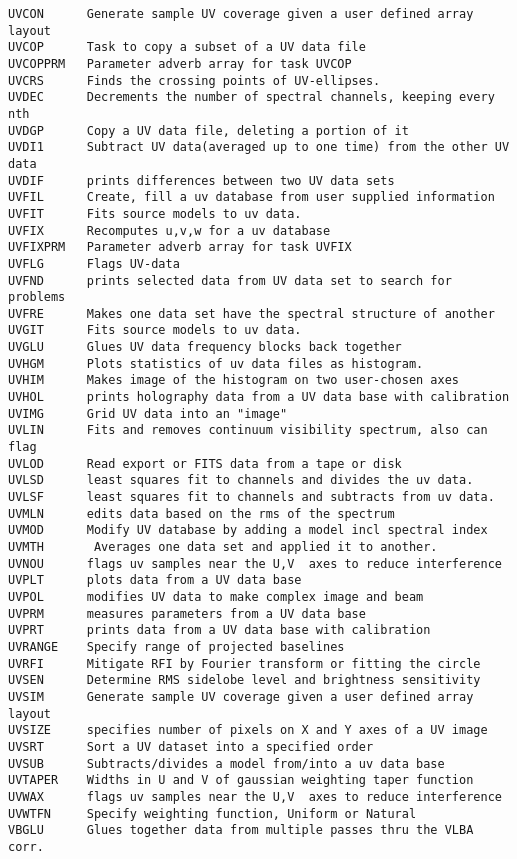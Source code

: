 \begin{verbatim}
UVCON      Generate sample UV coverage given a user defined array layout
UVCOP      Task to copy a subset of a UV data file
UVCOPPRM   Parameter adverb array for task UVCOP
UVCRS      Finds the crossing points of UV-ellipses.
UVDEC      Decrements the number of spectral channels, keeping every nth
UVDGP      Copy a UV data file, deleting a portion of it
UVDI1      Subtract UV data(averaged up to one time) from the other UV data
UVDIF      prints differences between two UV data sets
UVFIL      Create, fill a uv database from user supplied information
UVFIT      Fits source models to uv data.
UVFIX      Recomputes u,v,w for a uv database
UVFIXPRM   Parameter adverb array for task UVFIX
UVFLG      Flags UV-data
UVFND      prints selected data from UV data set to search for problems
UVFRE      Makes one data set have the spectral structure of another
UVGIT      Fits source models to uv data.
UVGLU      Glues UV data frequency blocks back together
UVHGM      Plots statistics of uv data files as histogram.
UVHIM      Makes image of the histogram on two user-chosen axes
UVHOL      prints holography data from a UV data base with calibration
UVIMG      Grid UV data into an "image"
UVLIN      Fits and removes continuum visibility spectrum, also can flag
UVLOD      Read export or FITS data from a tape or disk
UVLSD      least squares fit to channels and divides the uv data.
UVLSF      least squares fit to channels and subtracts from uv data.
UVMLN      edits data based on the rms of the spectrum
UVMOD      Modify UV database by adding a model incl spectral index
UVMTH       Averages one data set and applied it to another.
UVNOU      flags uv samples near the U,V  axes to reduce interference
UVPLT      plots data from a UV data base
UVPOL      modifies UV data to make complex image and beam
UVPRM      measures parameters from a UV data base
UVPRT      prints data from a UV data base with calibration
UVRANGE    Specify range of projected baselines
UVRFI      Mitigate RFI by Fourier transform or fitting the circle
UVSEN      Determine RMS sidelobe level and brightness sensitivity
UVSIM      Generate sample UV coverage given a user defined array layout
UVSIZE     specifies number of pixels on X and Y axes of a UV image
UVSRT      Sort a UV dataset into a specified order
UVSUB      Subtracts/divides a model from/into a uv data base
UVTAPER    Widths in U and V of gaussian weighting taper function
UVWAX      flags uv samples near the U,V  axes to reduce interference
UVWTFN     Specify weighting function, Uniform or Natural
VBGLU      Glues together data from multiple passes thru the VLBA corr.

\end{verbatim}
